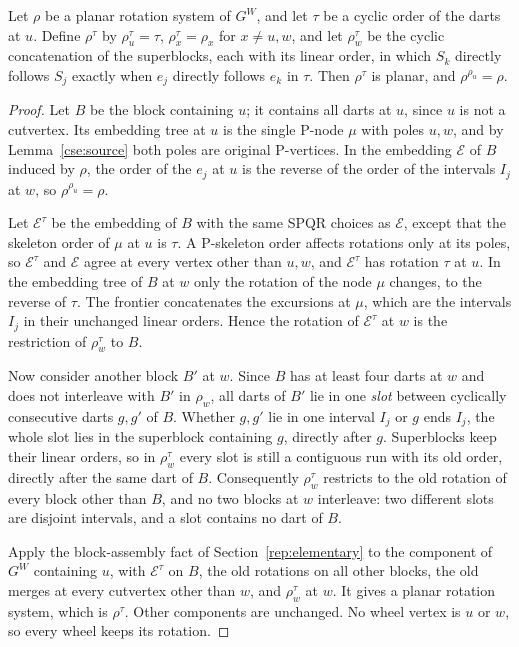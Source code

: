 \begin{lemma}
\label{cse:superblock-planar}
Let $\rho$ be a planar rotation system of $G^W$, and let $\tau$ be a cyclic
order of the darts at $u$. Define $\rho^\tau$ by $\rho^\tau_u=\tau$,
$\rho^\tau_x=\rho_x$ for $x\ne u,w$, and let $\rho^\tau_w$ be the cyclic
concatenation of the superblocks, each with its linear order, in which
$S_k$ directly follows $S_j$ exactly when $e_j$ directly follows $e_k$ in
$\tau$. Then $\rho^\tau$ is planar, and $\rho^{\rho_u}=\rho$.
\end{lemma}
\begin{proof}
Let $B$ be the block containing $u$; it contains all darts at $u$, since
$u$ is not a cutvertex. Its embedding tree at $u$ is the single P-node
$\mu$ with poles $u,w$, and by Lemma~\ref{cse:source} both poles are
original P-vertices. In the embedding $\mathcal E$ of $B$ induced by
$\rho$, the order of the $e_j$ at $u$ is the reverse of the order of the
intervals $I_j$ at $w$, so $\rho^{\rho_u}=\rho$.

Let $\mathcal E^\tau$ be the embedding of $B$ with the same SPQR choices
as $\mathcal E$, except that the skeleton order of $\mu$ at $u$ is $\tau$.
A P-skeleton order affects rotations only at its poles, so
$\mathcal E^\tau$ and $\mathcal E$ agree at every vertex other than $u,w$,
and $\mathcal E^\tau$ has rotation $\tau$ at $u$. In the embedding tree of
$B$ at $w$ only the rotation of the node $\mu$ changes, to the reverse of
$\tau$. The frontier concatenates the excursions at $\mu$, which are the
intervals $I_j$ in their unchanged linear orders. Hence the rotation of
$\mathcal E^\tau$ at $w$ is the restriction of $\rho^\tau_w$ to $B$.

Now consider another block $B'$ at $w$. Since $B$ has at least four darts
at $w$ and does not interleave with $B'$ in $\rho_w$, all darts of $B'$
lie in one \emph{slot} between cyclically consecutive darts $g,g'$ of $B$.
Whether $g,g'$ lie in one interval $I_j$ or $g$ ends $I_j$, the whole slot
lies in the superblock containing $g$, directly after $g$. Superblocks keep
their linear orders, so in $\rho^\tau_w$ every slot is still a contiguous
run with its old order, directly after the same dart of $B$. Consequently
$\rho^\tau_w$ restricts to the old rotation of every block other than $B$,
and no two blocks at $w$ interleave: two different slots are disjoint
intervals, and a slot contains no dart of $B$.

Apply the block-assembly fact of Section~\ref{rep:elementary} to the
component of $G^W$ containing $u$, with $\mathcal E^\tau$ on $B$, the old
rotations on all other blocks, the old merges at every cutvertex other
than $w$, and $\rho^\tau_w$ at $w$. It gives a planar rotation system,
which is $\rho^\tau$. Other components are unchanged. No wheel vertex is
$u$ or $w$, so every wheel keeps its rotation.
\end{proof}

